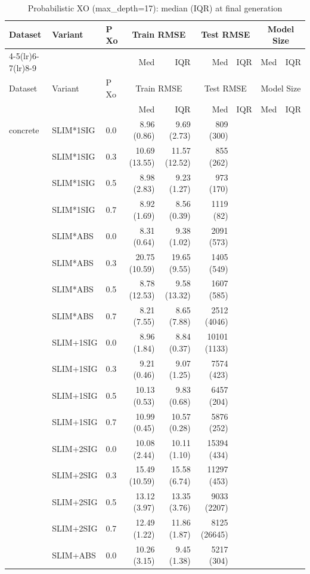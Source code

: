 \begin{longtable}{lllrrrrrr}
\caption{Probabilistic XO (max\_depth=17): median (IQR) at final generation} \label{tab:prob_xo} \\
\toprule
Dataset & Variant & P Xo & \multicolumn{2}{c}{Train RMSE} & \multicolumn{2}{c}{Test RMSE} & \multicolumn{2}{c}{Model Size} \\
\cmidrule(lr){4-5}\cmidrule(lr){6-7}\cmidrule(lr){8-9}
 & &  & Med & IQR & Med & IQR & Med & IQR \\
\midrule
\endfirsthead
\toprule
Dataset & Variant & P Xo & \multicolumn{2}{c}{Train RMSE} & \multicolumn{2}{c}{Test RMSE} & \multicolumn{2}{c}{Model Size} \\
 & &  & Med & IQR & Med & IQR & Med & IQR \\
\midrule
\endhead
\bottomrule
\endfoot
concrete & SLIM*1SIG & 0.0 & 8.96 (0.86) & 9.69 (2.73) & 809 (300) \\
 & SLIM*1SIG & 0.3 & 10.69 (13.55) & 11.57 (12.52) & 855 (262) \\
 & SLIM*1SIG & 0.5 & 8.98 (2.83) & 9.23 (1.27) & 973 (170) \\
 & SLIM*1SIG & 0.7 & 8.92 (1.69) & 8.56 (0.39) & 1119 (82) \\
 & SLIM*ABS & 0.0 & 8.31 (0.64) & 9.38 (1.02) & 2091 (573) \\
 & SLIM*ABS & 0.3 & 20.75 (10.59) & 19.65 (9.55) & 1405 (549) \\
 & SLIM*ABS & 0.5 & 8.78 (12.53) & 9.58 (13.32) & 1607 (585) \\
 & SLIM*ABS & 0.7 & 8.21 (7.55) & 8.65 (7.88) & 2512 (4046) \\
 & SLIM+1SIG & 0.0 & 8.96 (1.84) & 8.84 (0.37) & 10101 (1133) \\
 & SLIM+1SIG & 0.3 & 9.21 (0.46) & 9.07 (1.25) & 7574 (423) \\
 & SLIM+1SIG & 0.5 & 10.13 (0.53) & 9.83 (0.68) & 6457 (204) \\
 & SLIM+1SIG & 0.7 & 10.99 (0.45) & 10.57 (0.28) & 5876 (252) \\
 & SLIM+2SIG & 0.0 & 10.08 (2.44) & 10.11 (1.10) & 15394 (434) \\
 & SLIM+2SIG & 0.3 & 15.49 (10.59) & 15.58 (6.74) & 11297 (453) \\
 & SLIM+2SIG & 0.5 & 13.12 (3.97) & 13.35 (3.76) & 9033 (2207) \\
 & SLIM+2SIG & 0.7 & 12.49 (1.22) & 11.86 (1.87) & 8125 (26645) \\
 & SLIM+ABS & 0.0 & 10.26 (3.15) & 9.45 (1.38) & 5217 (304) \\

\end{longtable}
